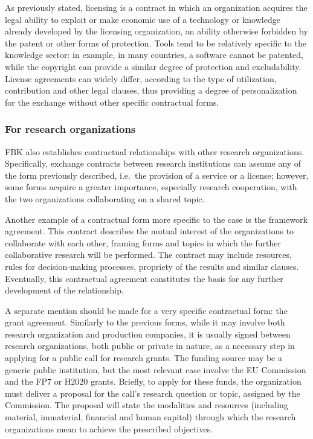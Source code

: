 As previously stated, licensing is a contract in which an organization acquires the legal ability to exploit or make economic use of a technology or knowledge already developed by the licensing organization, an ability otherwise forbidden by the patent or other forms of protection. Tools tend to be relatively specific to the knowledge sector: in example, in many countries, a software cannot be patented, while the copyright can provide a similar degree of protection and excludability. License agreements can widely differ, according to the type of utilization, contribution and other legal clauses, thus providing a degree of personalization for the exchange without other specific contractual forms.

\subsubsection{For research organizations}

FBK also establishes contractual relationships with other research organizations. Specifically, exchange contracts between research institutions can assume any of the form previously described, i.e.\ the provision of a service or a license; however, some forms acquire a greater importance, especially research cooperation, with the two organizations collaborating on a shared topic.

Another example of a contractual form more specific to the case is the framework agreement. This contract describes the mutual interest of the organizations to collaborate with each other, framing forms and topics in which the further collaborative research will be performed. The contract may include resources, rules for decision-making processes, propriety of the results and similar clauses. Eventually, this contractual agreement constitutes the basis for any further development of the relationship.

A separate mention should be made for a very specific contractual form: the grant agreement. Similarly to the previous forms, while it may involve both research organization and production companies, it is usually signed between research organizations, both public or private in nature, as a necessary step in applying for a public call for research grants. The funding source may be a generic public institution, but the most relevant case involve the EU Commission and the FP7 or H2020 grants. Briefly, to apply for these funds, the organization must deliver a proposal for the call's research question or topic, assigned by the Commission. The proposal will state the modalities and resources (including material, immaterial, financial and human capital) through which the research organizations mean to achieve the prescribed objectives.

